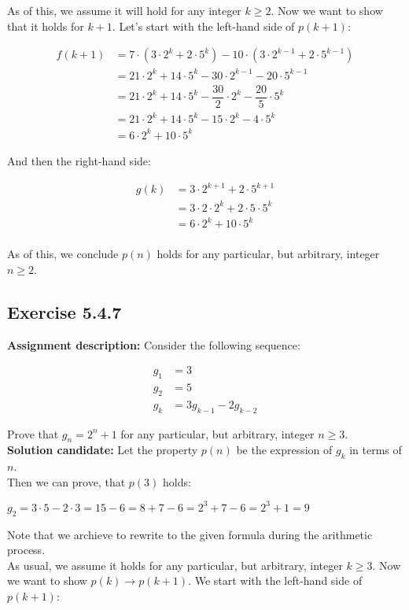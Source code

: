 \documentclass{report}
\newcommand{\cent}[1]{\begin{center}#1\end{center}}
\newcommand{\mAlign}[1]{\begin{align*}#1\end{align*}}
\newcommand{\assignmentDescription}{\textbf{Assignment description: }}
\newcommand{\solution}{\textbf{Solution candidate: }}
\newcommand{\QED}{\boxed{}}
\newcommand{\Exercise}[1]{\subsection{Exercise #1}}
\newcommand{\parenthesis}[1]{\left( #1 \right)}
\begin{document}
 	As of this, we assume it will hold for any integer $k \geq 2$. Now we want to show that it holds for $k+1$. Let's start with the left-hand side of $p(k+1)$:
 	
 	\mAlign{
 		f(k+1) &=  7 \cdot \parenthesis{3 \cdot 2^k + 2 \cdot 5^k} - 10 \cdot \parenthesis{3 \cdot 2^{k-1} + 2 \cdot 5^{k-1}} \\
 		&=  21 \cdot 2^k+ 14  \cdot 5^k - 30 \cdot 2^{k-1} - 20 \cdot 5^{k-1} \\
 		&=  21 \cdot 2^k+ 14  \cdot 5^k - \dfrac{30}{2} \cdot 2^k -\dfrac{ 20 }{5} \cdot 5^k \\
 		&=  21 \cdot 2^k+ 14  \cdot 5^k - 15 \cdot 2^k -4 \cdot 5^k \\
 		&=  6 \cdot 2^k+ 10  \cdot 5^k
 	}
 
 	And then the right-hand side:
 	
 	\mAlign{
 		g(k) &= 3 \cdot 2^{k+1} + 2 \cdot 5^{k+1} \\
 		&= 3 \cdot 2 \cdot 2^k  + 2 \cdot 5 \cdot 5^k\\
 		&= 6  \cdot 2^k  + 10 \cdot 5^k\\
 	}
 
 	As of this, we conclude $p(n)$ holds for any particular, but arbitrary, integer $n \geq 2$.
 	\QED
 	
 	\Exercise{5.4.7}
 	
 	\assignmentDescription
 	Consider the following sequence:
 	
 	\mAlign{
 		g_1 &= 3 \\
 		g_2 &= 5 \\
 		g_k &= 3g_{k-1} - 2 g_{k-2}
 	}
 	
 	Prove that $g_n = 2^n + 1$ for any particular, but arbitrary, integer $n \geq 3$.\\
 	
 	\solution
 	Let the property $p(n)$ be the expression of $g_k$ in terms of $n$.\\
 	
 	Then we can prove, that $p(3)$ holds:
 	
 	\cent{$g_2 = 3 \cdot 5 - 2 \cdot 3 = 15-6 = 8+7-6 = 2^3 +7-6 = 2^3 +1 = 9 $}
 	
 	Note that we archieve to rewrite to the given formula during the arithmetic process.\\
 	
 	As usual, we assume it holds for any particular, but arbitrary, integer $k \geq 3$. Now we want to show $p(k) \to p(k+1)$. We start with the left-hand side of $p(k+1)$:
 	
\end{document}
